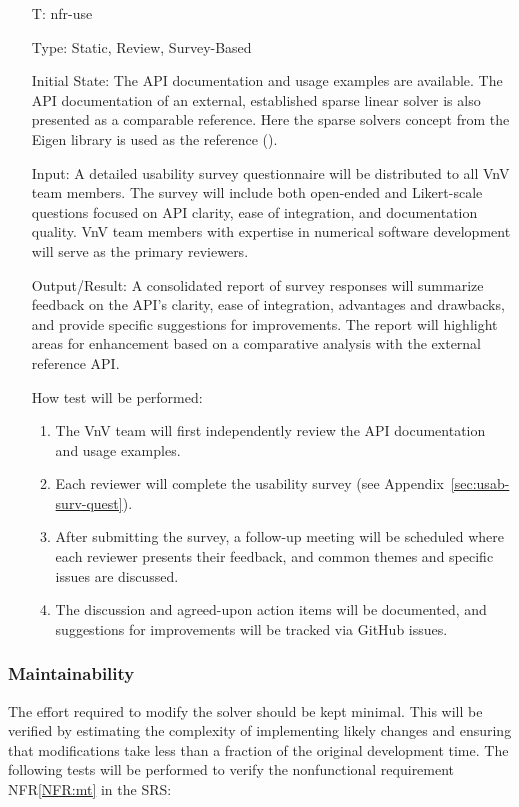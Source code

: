 \documentclass[12pt, titlepage]{article}
\newcounter{testnum} %
\newcommand{\nfrref}[1]{NFR\ref{#1}}
\begin{document}
\begin{itemize}

\item[T\refstepcounter{testnum}\thetestnum \label{T:use}:]{nfr-use}

Type: Static, Review, Survey-Based

Initial State: The API documentation and usage examples are available. The API
documentation of an external, established sparse linear solver is also presented
as a comparable reference. Here the sparse solvers concept from the Eigen
library is used as the reference (\cite{noauthor_eigen_nodate}).

Input: A detailed usability survey questionnaire will be distributed to all VnV
team members. The survey will include both open-ended and Likert-scale questions
focused on API clarity, ease of integration, and documentation quality. VnV team
members with expertise in numerical software development will serve as the
primary reviewers.

Output/Result: A consolidated report of survey responses will summarize feedback
on the API’s clarity, ease of integration, advantages and drawbacks, and provide
specific suggestions for improvements. The report will highlight areas for
enhancement based on a comparative analysis with the external reference API.

How test will be performed:
\begin{enumerate}
\item The VnV team will first independently review the API documentation and usage
  examples.
\item Each reviewer will complete the usability survey (see
  Appendix~\ref{sec:usab-surv-quest}).
\item After submitting the survey, a follow-up meeting will be scheduled where each
  reviewer presents their feedback, and common themes and specific issues are
  discussed.
\item The discussion and agreed-upon action items will be documented, and
  suggestions for improvements will be tracked via GitHub issues.
\end{enumerate}

\end{itemize}

\subsubsection{Maintainability}

The effort required to modify the solver should be kept minimal. This will be
verified by estimating the complexity of implementing likely changes and
ensuring that modifications take less than a fraction of the original
development time. The following tests will be performed to verify the
nonfunctional requirement \nfrref{NFR:mt} in the SRS:
\end{document}
